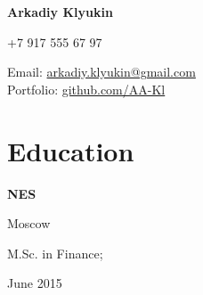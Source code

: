 \documentclass[a4paper,20pt]{article}
\begin{document}

\begin{center}
	\textbf{{\LARGE \color{black} Arkadiy Klyukin}}
\end{center}
\vspace{2pt}

	\begin{minipage}{.45\linewidth} 
		\begin{flushleft}
    			+7 917 555 67 97 \\     			
    		\end{flushleft} 
    	\end{minipage}
    \hfill 
    \begin{minipage}{.50\linewidth}
    		\begin{flushright}
    	 		Email: \href{mailto:arkadiy.klyukin@gmail.com} {arkadiy.klyukin@gmail.com} \\
    	 		Portfolio: \href{https://github.com/AA-Kl/}{github.com/AA-Kl} \\ 
    		\end{flushright}
    	\end{minipage}

\vspace{5pt}


\section{Education}
    \begin{minipage}{.75\linewidth} \begin{flushleft}
    		\textbf{NES}
    	\end{flushleft} \end{minipage}
    \hfill 
    \begin{minipage}{.20\linewidth}\begin{flushright}
    	 Moscow
    	\end{flushright}\end{minipage}
    	
    	\begin{minipage}{.75\linewidth} \begin{flushleft}
    		M.Sc. in Finance;  \\
    	\end{flushleft} \end{minipage}
    \hfill 
    \begin{minipage}{.20\linewidth}\begin{flushright}
    	 June 2015
    	\end{flushright}\end{minipage} 
	 \vspace{2pt}
	 
\end{document}
